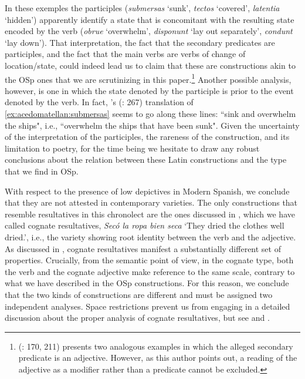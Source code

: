 \documentclass[output=paper,colorlinks,citecolor=brown,
]{langscibook}
\begin{document}
In these exemples the participles (\textit{submersas} `sunk', \textit{tectos} `covered', \emph{latentia} `hidden') apparently identify a state that is concomitant with the resulting state encoded by the verb (\textit{obrue} `overwhelm', \textit{disponunt} `lay out separately', \textit{condunt} `lay down'). That interpretation, the fact that the secondary predicates are participles, and the fact that the main verbs are verbs of change of location/state, could indeed lead us to claim that these are constructions akin to the OSp ones that we are scrutinizing in this paper.\footnote{\citeauthor{Acedo-Matellan2016} (\citeyear{Acedo-Matellan2016}: 170, 211) presents two analogous examples in which the alleged secondary predicate is an adjective. However, as this author points out, a reading of the adjective as a modifier rather than a predicate cannot be excluded.} Another possible analysis, however, is one in which the state denoted by the participle is prior to the event denoted by the verb. In fact, \citeauthor{Rushton1916}'s (\citeyear{Rushton1916}: 267) translation of \ref{ex:acedomatellan:submersas} seems to go along these lines:
``sink and overwhelm the ships", i.e., ``overwhelm the ships that have been sunk". Given the uncertainty of the interpretation of the participles, the rareness of the construction, and its limitation to poetry, for the time being we hesitate to draw any robust conclusions about the relation between these Latin constructions and the type that we find in OSp.

With respect to the presence of low depictives in Modern Spanish, we  conclude that they are not attested in contemporary varieties. The only constructions that resemble resultatives in this chronolect are the ones discussed in , which we have called cognate resultatives, \textit{Secó la ropa bien seca} `They dried the clothes well dried.’, i.e., the variety showing root identity between the verb and the adjective. As discussed in , cognate resultatives manifest a substantially different set of properties. Crucially, from the semantic point of view, in the cognate type,  both the verb and the cognate adjective make reference to the same scale, contrary to what we have described in the OSp constructions. For this reason, we conclude that the two kinds of  constructions are different and must be assigned two independent analyses.  Space restrictions prevent us from engaging in a detailed discussion about the proper analysis of cognate resultatives, but see  \citet{Armstrong2012}  and \citet{EspinalandMateu2018}.
\end{document}
